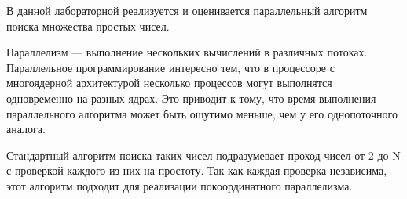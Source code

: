 В данной лабораторной реализуется и оценивается параллельный алгоритм поиска множества простых чисел.

Параллелизм --- выполнение нескольких вычислений в различных потоках. Параллельное программирование интересно тем, что в процессоре с многоядерной архитектурой несколько процессов могут выполнятся одновременно на разных ядрах. Это приводит к тому, что время выполнения параллельного алгоритма может быть ощутимо меньше, чем у его однопоточного аналога.

Стандартный алгоритм поиска таких чисел подразумевает проход чисел от 2 до N с проверкой каждого из них на простоту. Так как каждая проверка независима, этот алгоритм подходит для реализации покоординатного параллелизма.
